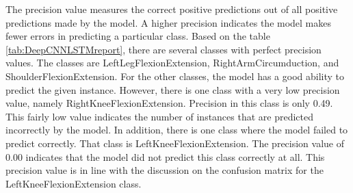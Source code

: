 The precision value measures the correct positive predictions out of all positive predictions made by the model. A higher precision indicates the model makes fewer errors in predicting a particular class. Based on the table \ref{tab:DeepCNNLSTMreport}, there are several classes with perfect precision values. The classes are LeftLegFlexionExtension, RightArmCircumduction, and ShoulderFlexionExtension. For the other classes, the model has a good ability to predict the given instance. However, there is one class with a very low precision value, namely RightKneeFlexionExtension. Precision in this class is only 0.49. This fairly low value indicates the number of instances that are predicted incorrectly by the model. In addition, there is one class where the model failed to predict correctly. That class is LeftKneeFlexionExtension. The precision value of 0.00 indicates that the model did not predict this class correctly at all. This precision value is in line with the discussion on the confusion matrix for the LeftKneeFlexionExtension class.

